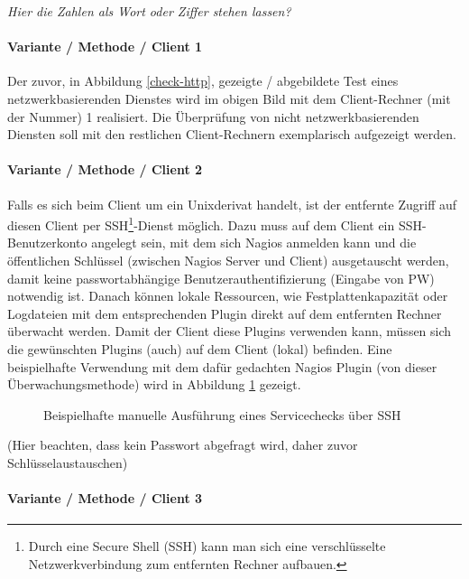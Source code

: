 \textit{Hier die Zahlen als Wort oder Ziffer stehen lassen?}

\paragraph{Variante / Methode / Client 1}

Der zuvor, in Abbildung \ref{check-http}, gezeigte / abgebildete Test eines netzwerkbasierenden Dienstes wird im obigen Bild mit dem Client-Rechner (mit der Nummer) 1 realisiert.
Die Überprüfung von nicht netzwerkbasierenden Diensten soll mit den restlichen Client-Rechnern exemplarisch aufgezeigt werden.

\paragraph{Variante / Methode / Client 2}

Falls es sich beim Client um ein Unixderivat handelt, ist der entfernte Zugriff auf diesen Client per SSH\footnote{Durch eine Secure Shell (SSH) kann man sich eine verschlüsselte Netzwerkverbindung zum entfernten Rechner aufbauen.}-Dienst möglich.
Dazu muss auf dem Client ein SSH-Benutzerkonto angelegt sein, mit dem sich Nagios anmelden kann und die öffentlichen Schlüssel (zwischen Nagios Server und Client) ausgetauscht werden, damit keine passwortabhängige Benutzerauthentifizierung (Eingabe von PW) notwendig ist.
Danach können lokale Ressourcen, wie Festplattenkapazität oder Logdateien mit dem entsprechenden Plugin direkt auf dem entfernten Rechner überwacht werden.
Damit der Client diese Plugins verwenden kann, müssen sich die gewünschten Plugins (auch) auf dem Client (lokal) befinden.
Eine beispielhafte Verwendung mit dem dafür gedachten Nagios Plugin  (von dieser Überwachungsmethode) wird in Abbildung \ref{check-ssh} gezeigt.

\begin{figure}[ht]
	\centering
		\caption{Beispielhafte manuelle Ausführung eines Servicechecks über SSH}
		\label{check-ssh}
\end{figure}

(Hier beachten, dass kein Passwort abgefragt wird, daher zuvor Schlüsselaustauschen)

\paragraph{Variante / Methode / Client 3}

